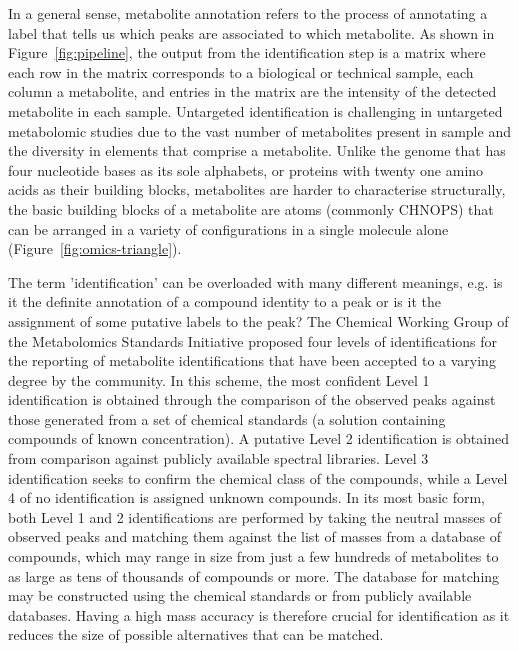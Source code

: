 In a general sense, metabolite annotation refers to the process of annotating a label that tells us which peaks are associated to which metabolite. As shown in Figure~\ref{fig:pipeline}, the output from the identification step is a matrix where each row in the matrix corresponds to a biological or technical sample, each column a metabolite, and entries in the matrix are the intensity of the detected metabolite in each sample. Untargeted identification is challenging in untargeted metabolomic studies due to the vast number of metabolites present in sample and the diversity in elements that comprise a metabolite. Unlike the genome that has four nucleotide bases as its sole alphabets, or proteins with twenty one amino acids as their building blocks, metabolites are harder to characterise structurally, the basic building blocks of a metabolite are atoms (commonly CHNOPS) that can be arranged in a variety of configurations in a single molecule alone (Figure~\ref{fig:omics-triangle}). 

The term 'identification' can be overloaded with many different meanings, e.g. is it the definite annotation of a compound identity to a peak or is it the assignment of some putative labels to the peak? The Chemical Working Group of the Metabolomics Standards Initiative proposed four levels of identifications for the reporting of metabolite identifications \cite{Sumner2007} that have been accepted to a varying degree by the community. In this scheme, the most confident Level 1 identification is obtained through the comparison of the observed peaks against those generated from a set of chemical standards (a solution containing compounds of known concentration). A putative Level 2 identification is obtained from comparison against publicly available spectral libraries. Level 3 identification seeks to confirm the chemical class of the compounds, while a Level 4 of no identification is assigned unknown compounds. In its most basic form, both Level 1 and 2 identifications are performed by taking the neutral masses of observed peaks and matching them against the list of masses from a database of compounds, which may range in size from just a few hundreds of metabolites to as large as tens of thousands of compounds or more. The database for matching may be constructed using the chemical standards or from publicly available databases. Having a high mass accuracy is therefore crucial for identification as it reduces the size of possible alternatives that can be matched. 

